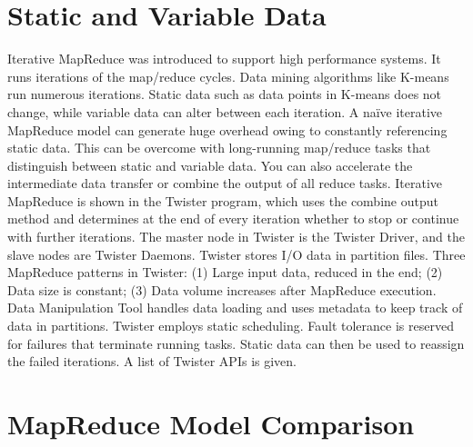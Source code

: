 


\section{Static and Variable Data}

Iterative MapReduce was introduced to support high performance systems.
It runs iterations of the map/reduce cycles. Data mining algorithms like
K-means run numerous iterations. Static data such as data points in
K-means does not change, while variable data can alter between each
iteration. A naïve iterative MapReduce model can generate huge overhead
owing to constantly referencing static data. This can be overcome with
long-running map/reduce tasks that distinguish between static and
variable data. You can also accelerate the intermediate data transfer or
combine the output of all reduce tasks. Iterative MapReduce is shown in
the Twister program, which uses the combine output method and determines
at the end of every iteration whether to stop or continue with further
iterations. The master node in Twister is the Twister Driver, and the
slave nodes are Twister Daemons. Twister stores I/O data in partition
files. Three MapReduce patterns in Twister: (1) Large input data, reduced
in the end; (2) Data size is constant; (3) Data volume increases after
MapReduce execution. Data Manipulation Tool handles data loading and
uses metadata to keep track of data in partitions. Twister employs
static scheduling. Fault tolerance is reserved for failures that
terminate running tasks. Static data can then be used to reassign the
failed iterations. A list of Twister APIs is given.




\section{MapReduce Model Comparison}

